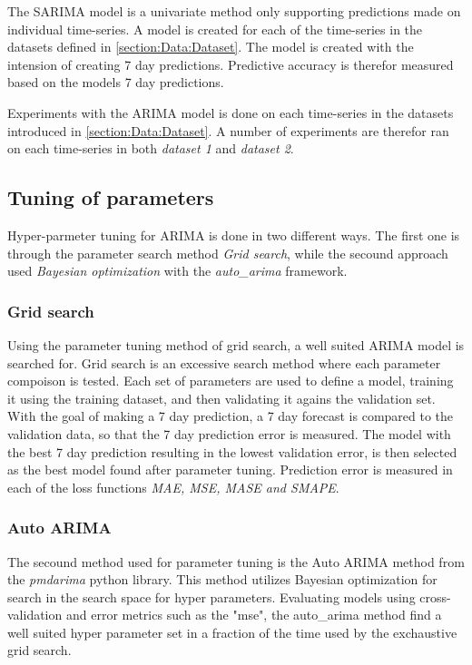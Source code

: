 \iffalse
The SARIMA model is a univariate method only supporting predictions made on individual time-series.
A model is created for each of the time-series in the datasets defined in \cref{section:Data:Dataset}.
The model is created with the intension of creating 7 day predictions.
Predictive accuracy is therefor measured based on the models 7 day predictions.

Experiments with the ARIMA model is done on each time-series in the datasets introduced in \cref{section:Data:Dataset}.
A number of experiments are therefor ran on each time-series in both \textit{dataset 1} and \textit{dataset 2}.


\iffalse
ARIMA models are first tuned on each time-series in order to make predicitons.
The hyper-parmeters fond after the tuning is then used in order to created models capable of making predictions.
The model attempts to make a 7 day ahead prediction.
\fi

\subsection{Tuning of parameters}
Hyper-parmeter tuning for ARIMA is done in two different ways.
The first one is through the parameter search method \textit{Grid search},
while the secound approach used \textit{Bayesian optimization} with the \textit{auto\_arima} framework.

\subsubsection*{Grid search}
Using the parameter tuning method of grid search, a well suited ARIMA model is searched for.
Grid search is an excessive search method where each parameter compoison is tested.
Each set of parameters are  used to define a model, training it using the training dataset,
and then validating it agains the validation set.
With the goal of making a 7 day prediction, a 7 day forecast is compared to the validation data,
so that the 7 day prediction error is measured.
The model with the best 7 day prediction resulting in the lowest validation error,
is then selected as the best model found after parameter tuning.
Prediction error is measured in each of the loss functions \textit{MAE, MSE, MASE and SMAPE}.

\subsubsection{Auto ARIMA}
The secound method used for parameter tuning is the Auto ARIMA method from the \textit{pmdarima} python library.
This method utilizes Bayesian optimization for search in the search space for hyper parameters.
Evaluating models using cross-validation and error metrics such as the "mse",
the auto\_arima method find a well suited hyper parameter set in a fraction of the time used by the exchaustive grid search.

